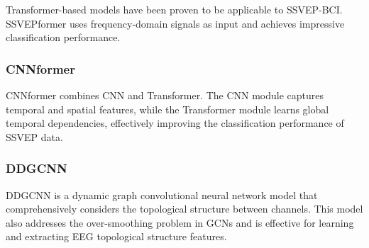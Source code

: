 \documentclass[10pt]{iopart}
\begin{document}
Transformer-based models have been proven to be applicable to SSVEP-BCI. SSVEPformer uses frequency-domain signals as input and achieves impressive classification performance\cite{chen2023transformer}.
‌\subsubsection{CNNformer\\}
CNNformer combines CNN and Transformer. The CNN module captures temporal and spatial features, while the Transformer module learns global temporal dependencies, effectively improving the classification performance of SSVEP data\cite{ding2024novel}.
‌\subsubsection{DDGCNN\\}
DDGCNN is a dynamic graph convolutional neural network model that comprehensively considers the topological structure between channels. This model also addresses the over-smoothing problem in GCNs and is effective for learning and extracting EEG topological structure features\cite{zhang2024dynamic}.
\end{document}
